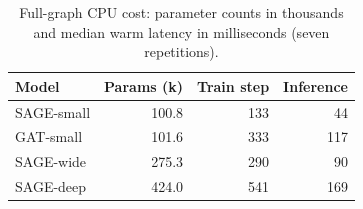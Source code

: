 \begin{table}[t]
\centering
\footnotesize
\caption{Full-graph CPU cost: parameter counts in thousands and median warm latency in milliseconds (seven repetitions).}
\label{tab:runtime}
\setlength{\tabcolsep}{4pt}
\begin{tabular}{lrrr}
\toprule
Model & Params (k) & Train step & Inference \\
\midrule
SAGE-small & 100.8 & 133 & 44 \\
GAT-small & 101.6 & 333 & 117 \\
SAGE-wide & 275.3 & 290 & 90 \\
SAGE-deep & 424.0 & 541 & 169 \\
\bottomrule
\end{tabular}
\end{table}
